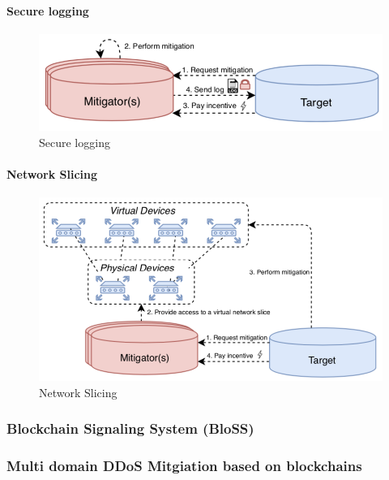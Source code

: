 \paragraph{Secure logging}
\begin{figure}[ht]
  \begin{center}
  \includegraphics[scale=0.6]{Talk7/img/ddos/cooperative_network_secure_logging}
  \end{center}
  \caption{Secure logging}
  \label{ddos_secure_logging}
\end{figure}

\paragraph{Network Slicing}
\begin{figure}[ht]
  \begin{center}
  \includegraphics[scale=0.6]{Talk7/img/ddos/cooperative_network_network_slicing}
  \end{center}
  \caption{Network Slicing}
  \label{ddos_network_slicing}
\end{figure}


\subsubsection{Blockchain Signaling System (BloSS)}

\subsubsection{Multi domain DDoS Mitgiation based on blockchains}
